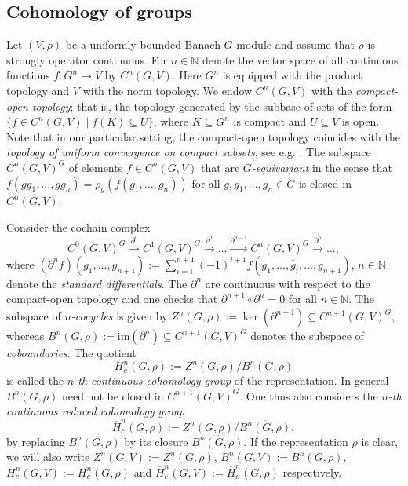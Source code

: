 \documentclass[a4paper,11pt,reqno]{amsart}
\numberwithin{equation}{section}
\theoremstyle{definition}
\theoremstyle{remark}
\theoremstyle{remark}
\begin{document}
\vspace{3mm}


\subsection{Cohomology of groups}

Let $(V,\rho)$ be a uniformly bounded Banach $G$-module and assume that $\rho$ is strongly operator continuous. For $n\in\mathbb{N}$ denote the vector space of all continuous functions $f:G^{n}\rightarrow V$ by $C^{n}(G,V)$. Here $G^n$ is equipped with the product topology and $V$ with the norm topology. We endow $C^{n}(G,V)$ with the \emph{compact-open topology}; that is, the topology generated by the subbase of sets of the form $\{f\in C^{n}(G,V)\mid f(K)\subseteq U\}$, where $K\subseteq G^{n}$ is compact and $U\subseteq V$ is open. Note that in our particular setting, the compact-open topology coincides with the \emph{topology of uniform convergence on compact subsets}, see e.g. \cite[Theorem 9.21]{Stroppel}. The subspace $C^{n}(G,V)^{G}$ of elements $f\in C^{n}(G,V)$ that are \emph{$G$-equivariant} in the sense that $f(gg_{1},...,gg_{n})=\rho_{g}(f(g_{1},...,g_{n}))$ for all $g,g_{1},...,g_{n}\in G$ is closed in $C^{n}(G,V)$.

Consider the cochain complex 
\[
C^{0}(G,V)^{G}\overset{\partial^{0}}{\longrightarrow}C^{1}(G,V)^{G}\overset{\partial^{1}}{\longrightarrow}...\overset{\partial^{n-1}}{\longrightarrow}C^{n}(G,V)^{G}\overset{\partial^{n}}{\longrightarrow}...,
\]
where $\left(\partial^{n}f\right)(g_{1},...,g_{n+1}):=\sum_{i=1}^{n+1}(-1)^{i+1}f(g_{1},...,\widehat{g}_{i},...,g_{n+1})$, $n\in\mathbb{N}$ denote the\emph{ standard differentials}. The $\partial^{n}$ are continuous with respect to the compact-open topology and one checks that $\partial^{n+1}\circ\partial^{n}=0$ for all $n\in\mathbb{N}$. The subspace of \emph{$n$-cocycles} is given by $Z^{n}(G,\rho):=\ker(\partial^{n+1})\subseteq C^{n+1}(G,V)^{G}$, whereas $B^{n}(G,\rho):=\text{im}(\partial^{n})\subseteq C^{n+1}(G,V)^{G}$ denotes the subspace of \emph{coboundaries}. The quotient 
\[
H_{c}^{n}(G,\rho):=Z^{n}(G,\rho)/B^{n}(G,\rho)
\]
is called the \emph{$n$-th continuous cohomology group} of the representation. In general $B^{n}(G,\rho)$ need not be closed in $C^{n+1}(G,V)^{G}$. One thus also considers the \emph{$n$-th continuous reduced cohomology group} 
\[
\overline{H}_{c}^{n}(G,\rho):=Z^{n}(G,\rho)/\overline{B^{n}(G,\rho)},
\]
by replacing $B^{n}(G,\rho)$ by its closure $\overline{B^{n}(G,\rho)}$. If the representation $\rho$ is clear, we will also write $Z^{n}(G,V):=Z^{n}(G,\rho)$, $B^{n}(G,V):=B^{n}(G,\rho)$, $H_{c}^{n}(G,V):=H_{c}^{n}(G,\rho)$ and $\overline{H}_{c}^{n}(G,V):=\overline{H}_{c}^{n}(G,\rho)$ respectively.
\end{document}
